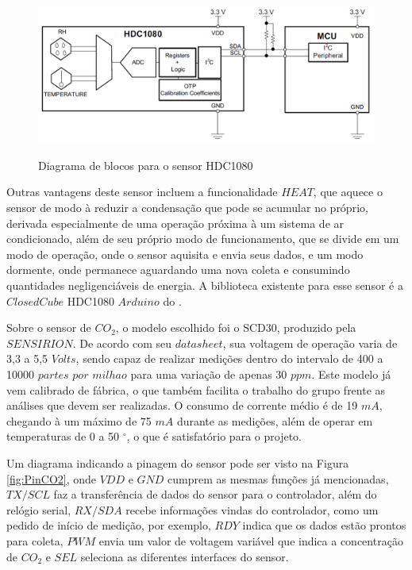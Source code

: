 \documentclass[acronym,symbols]{fei}
\begin{document}
\begin{figure}[!htb]
\centering
    \caption{Diagrama de blocos para o sensor HDC1080}
    \includegraphics[width=0.8\linewidth]{Imagens/DiagBlocHum.png}
    \label{fig:DiagBlocHum}
\end{figure}

Outras vantagens deste sensor incluem a funcionalidade $HEAT$, que aquece o sensor de modo à reduzir a condensação que pode se acumular no próprio, derivada especialmente de uma operação próxima à um sistema de ar condicionado, além de seu próprio modo de funcionamento, que se divide em um modo de operação, onde o sensor aquisita e envia seus dados, e um modo dormente, onde permanece aguardando uma nova coleta e consumindo quantidades negligenciáveis de energia. A biblioteca existente para esse sensor é a $ClosedCube$ HDC1080 $Arduino$ do \textcite{ClosedCubeHDC1080}.

Sobre o sensor de $CO_2$, o modelo escolhido foi o SCD30, produzido pela $SENSIRION$. De acordo com seu $datasheet$, sua voltagem de operação varia de 3,3 a 5,5 $Volts$, sendo capaz de realizar medições dentro do intervalo de 400 a 10000 $partes$ $por$ $milhao$ para uma variação de apenas 30 $ppm$. Este modelo já vem calibrado de fábrica, o que também facilita o trabalho do grupo frente as análises que devem ser realizadas. O consumo de corrente médio é de 19 $mA$, chegando à um máximo de 75 $mA$ durante as medições, além de operar em temperaturas de 0 a 50 $^{\circ}$, o que é satisfatório para o projeto. 

Um diagrama indicando a pinagem do sensor pode ser visto na Figura \ref{fig:PinCO2}, onde $VDD$ e $GND$ cumprem as mesmas funções já mencionadas, $TX/SCL$ faz a transferência de dados do sensor para o controlador, além do relógio serial, $RX/SDA$ recebe informações vindas do controlador, como um pedido de início de medição, por exemplo, $RDY$ indica que os dados estão prontos para coleta, $PWM$ envia um valor de voltagem variável que indica a concentração de $CO_2$ e $SEL$ seleciona as diferentes interfaces do sensor.
\end{document}
